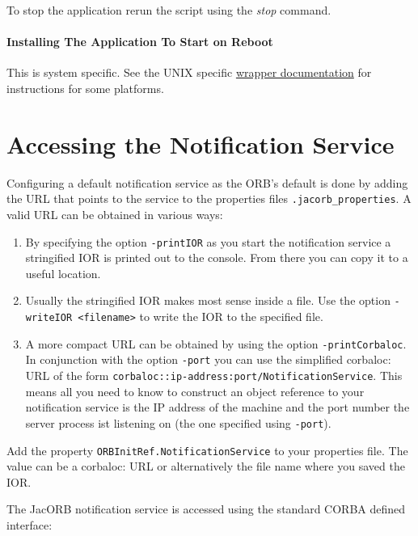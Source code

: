  To stop the application rerun the script using the \emph{stop} command.

 
 \paragraph{Installing The Application To Start on Reboot}
 \label{sec:inst-appl-start}

 This is system specific. See the UNIX specific
 \href{http://wrapper.tanukisoftware.org/doc/english/launch-nix.html}{wrapper
   documentation} for instructions for some platforms.

\section{Accessing the Notification Service}
\label{sec:access-notif-serv}

Configuring a default notification service as the ORB's default is done
by adding the URL that points to the service to the properties files
\texttt{.jacorb\_properties}. A valid URL can be obtained in various ways:

\begin{enumerate}
\item By specifying the option \texttt{-printIOR} as you start the
  notification service a stringified IOR is printed out to the
  console. From there you can copy it to a useful location.

\item Usually the stringified IOR makes most sense inside a file. Use
  the option \texttt{-writeIOR <filename>} to write the IOR to the specified
  file.

\item A more compact URL can be obtained by using the
  option \texttt{-printCorbaloc}. In conjunction with the option
  \texttt{-port} you can use the simplified corbaloc: URL of the form
  \texttt{corbaloc::ip-address:port/NotificationService}. This means
  all you need to know to construct an object reference to your
  notification service is the IP address of the machine and the port
  number the server process ist listening on (the one specified using
  \texttt{-port}). 

\end{enumerate}

Add the property \texttt{ORBInitRef.NotificationService} to your
properties file. The value can be a corbaloc: URL or alternatively the
file name where you saved the IOR.

The JacORB notification service is accessed using the standard CORBA
defined interface:

